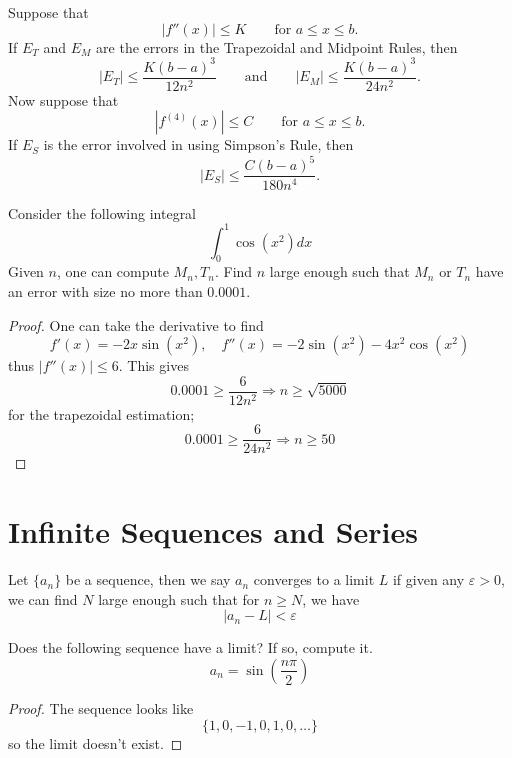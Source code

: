 \documentclass[openany]{book}
\begin{document}
\begin{prop}
    Suppose that
\[
|f''(x)| \leq K
\qquad \text{for } a \leq x \leq b.
\]
If $E_T$ and $E_M$ are the errors in the
Trapezoidal and Midpoint Rules, then
\[
\boxed{
|E_T| \leq \frac{K(b-a)^3}{12n^2}
}
\qquad \text{and} \qquad
\boxed{
|E_M| \leq \frac{K(b-a)^3}{24n^2}
}.
\]  
Now suppose that
\[
|f^{(4)}(x)| \leq C
\qquad \text{for } a\leq x\leq b.
\]
If \(E_S\) is the error involved in using Simpson's Rule,
then
\[
\boxed{
\left|E_S\right| \leq \frac{C(b-a)^5}{180n^4}
}.
\]
\end{prop}
\begin{prob}
    Consider the following integral 
    \begin{equation*}
        \int_0^1 \cos(x^2)dx
    \end{equation*}
    Given $n$, one can compute $M_n, T_n$. Find $n$ large enough such that $M_n$ or $T_n$ have an error with size no more than $0.0001$.
\end{prob}
\begin{proof}
    One can take the derivative to find 
    \begin{equation*}
        f'(x)=-2x\sin(x^2), \quad f''(x)=-2\sin(x^2)-4x^2\cos(x^2)
    \end{equation*}
    thus $|f''(x)|\leq 6$. This gives 
    \begin{equation*}
        0.0001\geq\frac{6}{12n^2}\Rightarrow n\geq\sqrt{5000}
    \end{equation*}
    for the trapezoidal estimation; 
    \begin{equation*}
        0.0001\geq\frac{6}{24n^2}\Rightarrow n\geq 50
    \end{equation*}
\end{proof}

\chapter{Infinite Sequences and Series}
\begin{defn}
    Let $\{a_n\}$ be a sequence, then we say $a_n$ converges to a limit $L$ if given any $\varepsilon>0$, we can find $N$ large enough such that for $n\geq N$, we have 
    \begin{equation*}
        |a_n-L|<\varepsilon
    \end{equation*}
\end{defn}

\begin{prob}
    Does the following sequence have a limit? If so, compute it.
    \begin{equation*}
        a_n=\sin\left(\frac{n\pi}{2}\right)
    \end{equation*}
\end{prob}
\begin{proof}
    The sequence looks like 
    \begin{equation*}
        \{1, 0, -1, 0, 1, 0, \dots\}
    \end{equation*}
    so the limit doesn't exist.
\end{proof}
\end{document}
